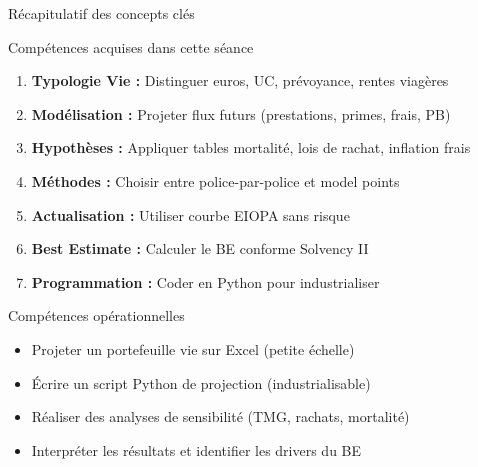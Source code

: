 \documentclass[10pt,aspectratio=169]{beamer}
\begin{document}
\begin{frame}{Récapitulatif des concepts clés}
\begin{block}{Compétences acquises dans cette séance}
\begin{enumerate}
    \item \textbf{Typologie Vie :} Distinguer euros, UC, prévoyance, rentes viagères
    \item \textbf{Modélisation :} Projeter flux futurs (prestations, primes, frais, PB)
    \item \textbf{Hypothèses :} Appliquer tables mortalité, lois de rachat, inflation frais
    \item \textbf{Méthodes :} Choisir entre police-par-police et model points
    \item \textbf{Actualisation :} Utiliser courbe EIOPA sans risque
    \item \textbf{Best Estimate :} Calculer le BE conforme Solvency II
    \item \textbf{Programmation :} Coder en Python pour industrialiser
\end{enumerate}
\end{block}

\vspace{0.3cm}
\begin{alertblock}{Compétences opérationnelles}
\begin{itemize}
    \item[$\checkmark$] Projeter un portefeuille vie sur Excel (petite échelle)
    \item[$\checkmark$] Écrire un script Python de projection (industrialisable)
    \item[$\checkmark$] Réaliser des analyses de sensibilité (TMG, rachats, mortalité)
    \item[$\checkmark$] Interpréter les résultats et identifier les drivers du BE
\end{itemize}
\end{alertblock}
\end{frame}
\end{document}
